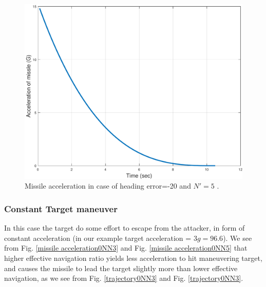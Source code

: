 \begin{figure}[htb]
	\centering
	\includegraphics[scale = 0.75]{fig/MissileAcceleration20N5.pdf}
	\caption{Missile acceleration in case of heading error=-20 and $N'=5$ .}
	\label{missile acceleration20N5}
\end{figure}


\subsubsection{Constant Target maneuver}
In this case the target do some effort to escape from the attacker, in form of constant acceleration (in our example target acceleration = $3g=96.6$).
We see from Fig. \ref{missile acceleration0NN3} and Fig. \ref{missile acceleration0NN5} that higher effective navigation ratio yields less acceleration to hit maneuvering target, and causes the missile to lead the target slightly more than lower effective navigation, as we see from Fig. \ref{trajectory0NN3} and Fig. \ref{trajectory0NN3}.



